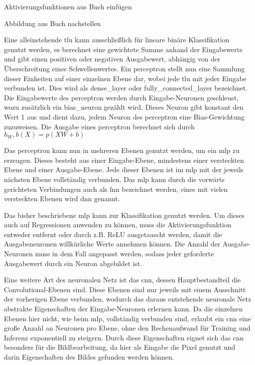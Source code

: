 Aktivierungsfunktionen aus Buch einfügen

Abbildung aus Buch nachstellen

Eine alleinstehende \gls{tlu} kann ausschließlich für lineare binäre Klassifikation genutzt werden, es berechnet eine gewichtete Summe anhand der Eingabewerte und gibt einen positiven oder negativen Ausgabewert, abhängig von der Überschreitung eines Schwellenwertes. Ein \gls{perceptron} stellt nun eine Sammlung dieser Einheiten auf einer einzelnen Ebene dar, wobei jede \gls{tlu} mit jeder Eingabe verbunden ist. Dies wird als \gls{dense_layer} oder \gls{fully_connected_layer} bezeichnet. Die Eingabewerte des \gls{perceptron} werden durch Eingabe-Neuronen geschleust, wozu zusätzlich ein \gls{bias_neuron} gezählt wird. Dieses Neuron gibt konstant den Wert 1 aus und dient dazu, jedem Neuron des \gls{perceptron} eine Bias-Gewichtung zuzuweisen. Die Ausgabe eines \gls{perceptron} berechnet sich durch \(h_W,b(X)=p(XW+b)\) \cite[S. 284 ff.]{Geron2019}

Das \gls{perceptron} kann nun in mehreren Ebenen genutzt werden, um ein \gls{mlp} zu erzeugen. Dieses besteht aus einer Eingabe-Ebene, mindestens einer versteckten Ebene und einer Ausgabe-Ebene. Jede dieser Ebenen ist im \gls{mlp} mit der jeweils nächsten Ebene vollständig verbunden. Das \gls{mlp} kann durch die vorwärts gerichteten Verbindungen auch als \gls{fnn} bezeichnet werden, eines mit vielen versteckten Ebenen wird \gls{dnn} genannt. \cite[S. 284 ff.]{Geron2019}

Das bisher beschriebene \gls{mlp} kann zur Klassifikation genutzt werden. Um dieses auch auf Regressionen anwenden zu können, muss die Aktivierungsfunktion entweder entfernt oder durch z.B. ReLU ausgetauscht werden, damit die Ausgabeneuronen willkürliche Werte annehmen können. Die Anzahl der Ausgabe-Neuronen muss in dem Fall angepasst werden, sodass jeder geforderte Ausgabewert durch ein Neuron abgebildet ist. \cite[S. 292 ff.]{Geron2019}

Eine weitere Art des neuronalen Netz ist das \gls{cnn}, dessen Hauptbestandteil die Convolutional-Ebenen sind. Diese Ebenen sind nur jeweils mit einem Ausschnitt der vorherigen Ebene verbunden, wodurch das daraus entstehende neuronale Netz abstrakte Eigenschaften der Eingabe-Neuronen erlernen kann. Da die einzelnen Ebenen hier nicht, wie beim \gls{mlp}, vollständig verbunden sind, erlaubt ein \gls{cnn} eine große Anzahl an Neuronen pro Ebene, ohne den Rechenaufwand für Training und Inferenz exponentiell zu steigern. Durch diese Eigenschaften eignet sich das \gls{cnn} besonders für die Bildbearbeitung, da hier als Eingabe die Pixel genutzt und darin Eigenschaften des Bildes gefunden werden können. \cite[S. 447 f.]{Geron2019}

